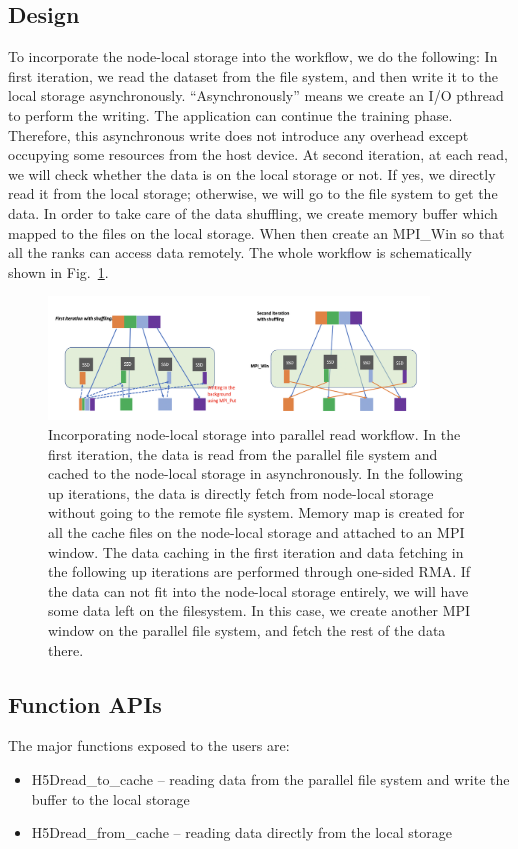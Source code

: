 \documentclass[aps, rmp, 11pt, notitlepage]{revtex4-1}
\begin{document}
\subsection{Design}
To incorporate the node-local storage into the workflow, we do the following:
In first iteration, we read the dataset from the file system, and then write it to the local storage asynchronously. “Asynchronously” means we create an I/O pthread to perform the writing. The application can continue the training phase. Therefore, this asynchronous write does not introduce any overhead except occupying some resources from the host device. At second iteration, at each read, we will check whether the data is on the local storage or not. If yes, we directly read it from the local storage; otherwise, we will go to the file system to get the data. In order to take care of the data shuffling, we create memory buffer which mapped to the files on the local storage. When then create an MPI\_Win so that all the ranks can access data remotely. The whole workflow is schematically shown in Fig.~\ref{fig:read}. 
\begin{figure}[hbt]
\centering
\includegraphics[width=0.9\textwidth]{parallel_read.png}
\caption{Incorporating node-local storage into parallel read workflow. In the first iteration, the data is read from the parallel file system and cached to the node-local storage in asynchronously. In the following up iterations, the data is directly fetch from node-local storage without going to the remote file system. Memory map is created for all the cache files on the node-local storage and attached to an MPI window. The data caching in the first iteration and data fetching in the following up iterations are performed through one-sided RMA. If the data can not fit into the node-local storage entirely, we will have some data left on the filesystem. In this case, we create another MPI window on the parallel file system, and fetch the rest of the data there.}\label{fig:read}
\end{figure}

\subsection{Function APIs}
The major functions exposed to the users are: 
\begin{itemize}
\item H5Dread\_to\_cache -- reading data from the parallel file system and write the buffer to the local storage
\item H5Dread\_from\_cache -- reading data directly from the local storage
\end{itemize}
\end{document}
